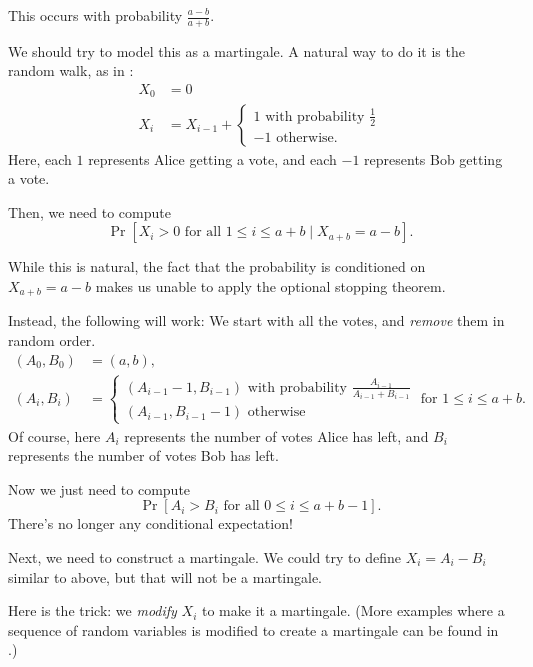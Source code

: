 \begin{proposition}
	This occurs with probability $\frac{a-b}{a+b}$.
\end{proposition}

We should try to model this as a martingale.
A natural way to do it is the random walk, as in :
\begin{align*}
	X_0 &= 0 \\
	X_i &= X_{i-1} +
	\begin{cases}
		1\text{ with probability }\frac{1}{2} \\
		-1\text{ otherwise.}
	\end{cases}
\end{align*}
Here, each $1$ represents Alice getting a vote, and each $-1$ represents Bob getting a vote.

Then, we need to compute
\[ \Pr[X_i > 0\text{ for all }1 \leq i \leq a+b \mid X_{a+b} = a-b]. \]

While this is natural, the fact that the probability is conditioned on $X_{a+b}=a-b$ makes us unable
to apply the optional stopping theorem.

Instead, the following will work:
We start with all the votes, and \emph{remove} them in random order.
\begin{align*}
	(A_0, B_0) &= (a, b), \\
	(A_i, B_i) &=
	\begin{cases}
		(A_{i-1}-1, B_{i-1})\text{ with probability }\frac{A_{i-1}}{A_{i-1}+B_{i-1}} \\
		(A_{i-1}, B_{i-1}-1)\text{ otherwise}
	\end{cases}
	\text{ for }1 \leq i \leq a+b.
\end{align*}
Of course, here $A_i$ represents the number of votes Alice has left,
and $B_i$ represents the number of votes Bob has left.

Now we just need to compute
\[ \Pr[A_i>B_i\text{ for all }0 \leq i \leq a+b-1]. \]
There's no longer any conditional expectation!

Next, we need to construct a martingale.
We could try to define $X_i = A_i-B_i$ similar to above, but that will not be a martingale.

Here is the trick: we \emph{modify} $X_i$ to make it a martingale. (More examples where a sequence
of random variables is modified to create a martingale can be found in .)

